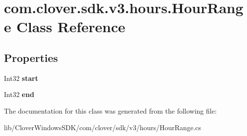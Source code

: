 \hypertarget{classcom_1_1clover_1_1sdk_1_1v3_1_1hours_1_1_hour_range}{}\section{com.\+clover.\+sdk.\+v3.\+hours.\+Hour\+Range Class Reference}
\label{classcom_1_1clover_1_1sdk_1_1v3_1_1hours_1_1_hour_range}
\subsection*{Properties}
\begin{DoxyCompactItemize}
\item 
\mbox{\label{classcom_1_1clover_1_1sdk_1_1v3_1_1hours_1_1_hour_range_a60dfdcfa17bb5b0e7ef47fdf5b3d6cde}} 
Int32 {\bfseries start}
\item 
\mbox{\label{classcom_1_1clover_1_1sdk_1_1v3_1_1hours_1_1_hour_range_a282272ee5138fddb43bba1e960b979c8}} 
Int32 {\bfseries end}
\end{DoxyCompactItemize}


The documentation for this class was generated from the following file\+:\begin{DoxyCompactItemize}
\item 
lib/\+Clover\+Windows\+S\+D\+K/com/clover/sdk/v3/hours/Hour\+Range.\+cs\end{DoxyCompactItemize}
